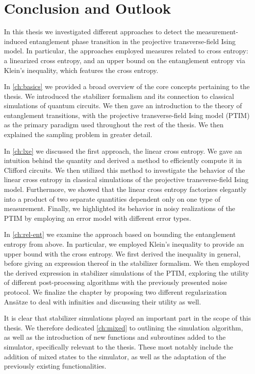 \chapter*{Conclusion and Outlook}

In this thesis we investigated different approaches to detect the
measurement-induced entanglement phase transition in the projective
transverse-field Ising model. In particular, the approaches employed measures
related to cross entropy: a linearized cross entropy, and an upper bound on
the entanglement entropy via Klein's inequality, which features the cross
entropy.

In \cref{ch:basics} we provided a broad overview of the core concepts
pertaining to the thesis. We introduced the stabilizer formalism and its
connection to classical simulations of quantum circuits. We then gave an
introduction to the theory of entanglement transitions, with the projective
transverse-field Ising model (PTIM) as the primary paradigm used throughout the rest
of the thesis. We then explained the sampling problem in greater detail.

In \cref{ch:lxe} we discussed the first approach, the linear cross entropy. We
gave an intuition behind the quantity and derived a method to efficiently
compute it in Clifford circuits. We then utilized this method to investigate
the behavior of the linear cross entropy in classical simulations of the
projective transverse-field Ising model. Furthermore, we showed that the linear
cross entropy factorizes elegantly into a product of two separate quantities
dependent only on one type of measurement. Finally, we highlighted its behavior
in noisy realizations of the PTIM by employing an error model with different
error types. 

In \cref{ch:rel-ent} we examine the approach based on bounding the entanglement
entropy from above. In particular, we employed Klein's inequality to provide an
upper bound with the cross entropy. We first derived the inequality in general,
before giving an expression thereof in the stabilizer formalism. We then
employed the derived expression in stabilizer simulations of the PTIM, exploring the
utility of different post-processing algorithms with the previously presented
noise protocol. We finalize the chapter by proposing two
different regularization Ans\"atze to deal with infinities and discussing their
utility as well.

It is clear that stabilizer simulations played an important part in the scope
of this thesis. We therefore dedicated \cref{ch:mixed} to outlining the
simulation algorithm, as well as the introduction of new functions and
subroutines added to the simulator, specifically relevant to the thesis. These
most notably include the addition of mixed states to the simulator, as well as
the adaptation of the previously existing functionalities.

